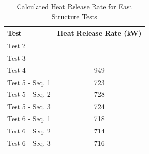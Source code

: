 \documentclass[12pt,oneside]{book}
\begin{document}
\begin{table}[!ht]
\caption{Calculated Heat Release Rate for East Structure Tests}
\begin{tabular}{lc}
 \toprule
\textbf{Test}  		& 	\textbf{Heat Release Rate (kW)} \\
\midrule
Test 2 				& 			\\
Test 3				& 			\\
Test 4				& 	949		\\
Test 5 - Seq. 1		&  	723		\\
Test 5 - Seq. 2		&  	728		\\
Test 5 - Seq. 3		&  	724	    \\
Test 6 - Seq. 1		&  	718	    \\
Test 6 - Seq. 2		&   714     \\
Test 6 - Seq. 3		&   716	 	\\
\bottomrule
\end{tabular}
\label{table:HRR_East}
\end{table}
\end{document}
